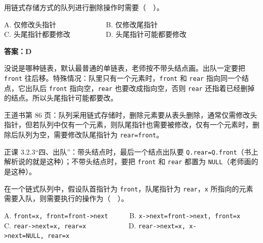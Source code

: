 \documentclass[10.5pt,a4paper,oneside]{article}
\newcommand{\hlred}[1]{\textcolor{wdred}{\bfseries #1}}
\begin{document}
\begin{questionbox}[15]

用链式存储方式的队列进行删除操作时需要（　）。

A. 仅修改头指针　　　　　　　B. 仅修改尾指针\\
C. 头尾指针都要修改　　　　　D. 头尾指针可能都要修改

\end{questionbox}

\hlred{\textbf{答案：D}}

\begin{videobox}

没说是哪种链表，默认最普通的单链表，老师按不带头结点画。出队一定要把
\texttt{front} 往后移。特殊情况：队里只有一个元素时，\texttt{front} 和
\texttt{rear} 指向同一个结点，它出队后 \texttt{front}
指向空，\texttt{rear} 也要改成指向空，否则 \texttt{rear}
还指着已经删掉的结点。所以头尾指针可能都要改。

\end{videobox}

\begin{jiexibox}

王道书第 86
页：队列采用链式存储时，删除元素要从表头删除，通常仅需修改头指针，但若队列中仅有一个元素，则队尾指针也需要被修改，仅有一个元素时，删除后队列为空，需要修改队尾指针为
\texttt{rear=front}。

\end{jiexibox}

\begin{recallbox}

正课 3.2.3“四、出队”：带头结点时，最后一个结点出队要
\texttt{Q.rear=Q.front}（书上解析说的就是这种）；不带头结点时，要把
\texttt{front} 和 \texttt{rear} 都置为 \texttt{NULL}（老师画的是这种）。

\end{recallbox}

\begin{questionbox}[16]

在一个链式队列中，假设队首指针为 \texttt{front}，队尾指针为
\texttt{rear}，\texttt{x}
所指向的元素需要入队，则需要执行的操作为（　）。

A. \texttt{front=x,\ front=front-\textgreater{}next}　　　B.
\texttt{x-\textgreater{}next=front-\textgreater{}next,\ front=x}\\
C. \texttt{rear-\textgreater{}next=x,\ rear=x}　　　　　　D.
\texttt{rear-\textgreater{}next=x,\ x-\textgreater{}next=NULL,\ rear=x}

\end{questionbox}
\end{document}

